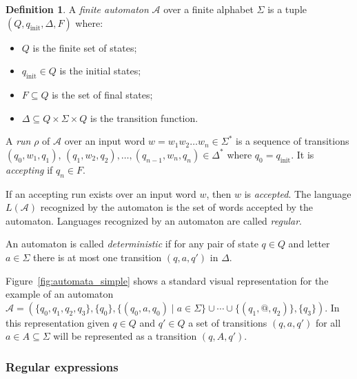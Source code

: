 \documentclass[12px]{article}
\theoremstyle{definition}
\newtheorem{definition}{Definition}
\begin{document}
      \begin{definition}
        A \textit{finite automaton} $\mathcal{A}$ over a finite alphabet
        $\Sigma$ is a tuple $(Q, q_\text{init}, \Delta, F)$ where:
          \begin{itemize}
            \item $Q$ is the finite set of states;
            \item $q_\text{init} \in Q$ is the initial states;
            \item $F \subseteq Q$ is the set of final states;
            \item $\Delta \subseteq Q \times \Sigma \times Q$ is the transition
              function.
          \end{itemize}

          A \textit{run} $\rho$ of $\mathcal{A}$ over an input word $w= w_1 w_2
          \ldots w_n \in \Sigma^*$ is a sequence of transitions $(q_0, w_1,
          q_1)$, $(q_1, w_2, q_2), \ldots, (q_{n-1}, w_n, q_n) \in \Delta^*$
          where $q_0 = q_\text{init}$. It is \textit{accepting} if $q_n \in F$.

          If an accepting run exists over an input word $w$, then $w$ is
          \textit{accepted}. The language $L(\mathcal{A})$ recognized by the
          automaton is the set of words accepted by the automaton. Languages
          recognized by an automaton are called \textit{regular}.

          An automaton is called \textit{deterministic} if for any pair of
          state $q \in Q$ and letter $a \in \Sigma$ there is at most one
          transition $(q, a, q')$ in $\Delta$.
        \end{definition}

        Figure~\ref{fig:automata_simple} shows a standard visual representation
        for the example of an automaton $\mathcal{A} = (\{q_0, q_1, q_2, q_3\},
        \{q_0\}, \{(q_0, a, q_0)\mid a \in \Sigma\} \cup \cdots \cup \{(q_1,
        \texttt{@}, q_2)\},\{q_3\})$. In this representation given $q \in Q$
        and $q' \in Q$ a set of transitions $(q, a, q')$ for all $a \in A
        \subseteq \Sigma$ will be represented as a transition $(q, A, q')$.

      \subsubsection{Regular expressions}%
        \label{sec:def:regex}
\end{document}
